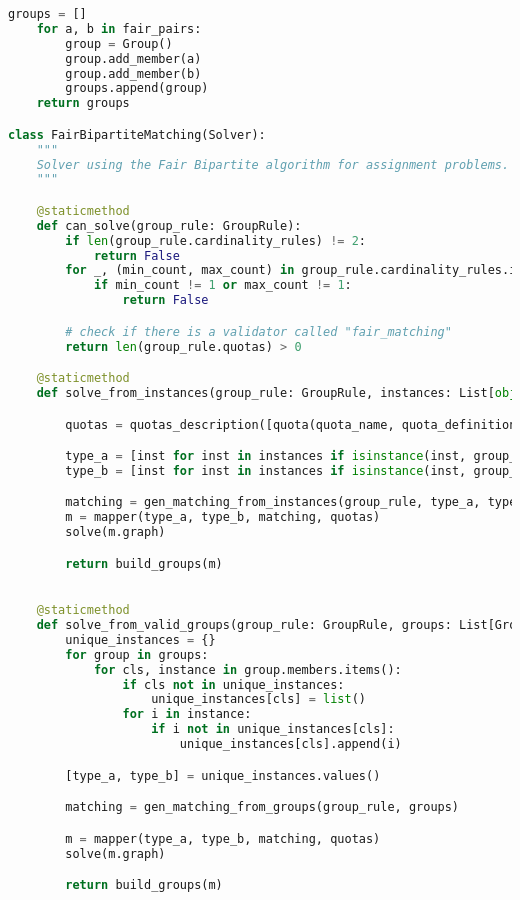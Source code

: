 \begin{apendicesenv}
\begin{lstlisting}[language=Python, caption={Fair Bipartite Matching Solver Source Code}]
    groups = []
    for a, b in fair_pairs:
        group = Group()
        group.add_member(a)
        group.add_member(b)
        groups.append(group)
    return groups

class FairBipartiteMatching(Solver):
    """
    Solver using the Fair Bipartite algorithm for assignment problems.
    """

    @staticmethod
    def can_solve(group_rule: GroupRule):
        if len(group_rule.cardinality_rules) != 2:
            return False
        for _, (min_count, max_count) in group_rule.cardinality_rules.items():
            if min_count != 1 or max_count != 1:
                return False

        # check if there is a validator called "fair_matching"
        return len(group_rule.quotas) > 0

    @staticmethod
    def solve_from_instances(group_rule: GroupRule, instances: List[object]):

        quotas = quotas_description([quota(quota_name, quota_definition) for quota_name, quota_definition in group_rule.quotas.items()])

        type_a = [inst for inst in instances if isinstance(inst, group_rule.types[0])]
        type_b = [inst for inst in instances if isinstance(inst, group_rule.types[1])]

        matching = gen_matching_from_instances(group_rule, type_a, type_b)
        m = mapper(type_a, type_b, matching, quotas)
        solve(m.graph)

        return build_groups(m)
    

    @staticmethod
    def solve_from_valid_groups(group_rule: GroupRule, groups: List[Group]):
        unique_instances = {}
        for group in groups:
            for cls, instance in group.members.items():
                if cls not in unique_instances:
                    unique_instances[cls] = list()
                for i in instance:
                    if i not in unique_instances[cls]:
                        unique_instances[cls].append(i)

        [type_a, type_b] = unique_instances.values()

        matching = gen_matching_from_groups(group_rule, groups)

        m = mapper(type_a, type_b, matching, quotas)
        solve(m.graph)

        return build_groups(m)
\end{lstlisting}

\end{apendicesenv}
